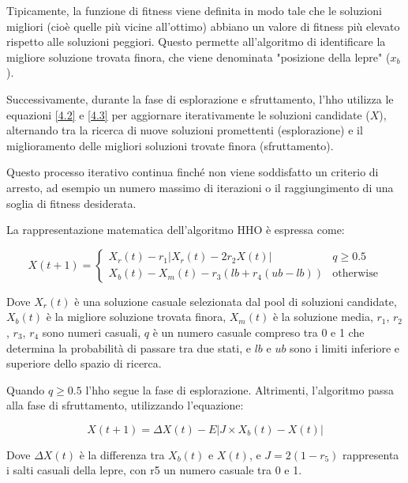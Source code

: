 Tipicamente, la funzione di fitness viene definita in modo tale che le soluzioni migliori (cioè quelle più vicine all'ottimo) abbiano un valore di fitness più elevato rispetto alle soluzioni peggiori. Questo permette all'algoritmo di identificare la migliore soluzione trovata finora, che viene denominata "posizione della lepre" ($x_b$).

Successivamente, durante la fase di esplorazione e sfruttamento, l'\gls{hho} utilizza le equazioni \eqref{4.2} e \eqref{4.3} per aggiornare iterativamente le soluzioni candidate ($X$), alternando tra la ricerca di nuove soluzioni promettenti (esplorazione) e il miglioramento delle migliori soluzioni trovate finora (sfruttamento). 

Questo processo iterativo continua finché non viene soddisfatto un criterio di arresto, ad esempio un numero massimo di iterazioni o il raggiungimento di una soglia di fitness desiderata.

La rappresentazione matematica dell'algoritmo HHO è espressa come:

\begin{equation}
      X(t+1) =
      \begin{cases}
            X_r(t) - r_1 |X_r(t) - 2r_2 X(t)| &  q \ge 0.5 \\
            X_b(t) - X_m(t) - r_3 (lb + r_4 (ub - lb)) & \text{otherwise}
      \end{cases}
      \label{4.2}
\end{equation} 

Dove $X_r(t)$  è una soluzione casuale selezionata dal pool di soluzioni candidate, $X_{b}(t)$ è la migliore soluzione trovata finora, $X_{m}(t)$ è la soluzione media, $r_1$, $r_2$, $r_3$, $r_4$ sono numeri casuali, $q$ è un numero casuale compreso tra 0 e 1 che determina la probabilità di passare tra due stati, e $lb$ e $ub$ sono i limiti inferiore e superiore dello spazio di ricerca.

Quando $q\geq0.5$ l'\gls{hho} segue la fase di esplorazione. Altrimenti, l'algoritmo passa alla fase di sfruttamento, utilizzando l'equazione:

\begin{equation}
      X(t+1) = \Delta X(t) - E|J \times X_b(t) - X(t)| 
      \label{4.3}
\end{equation}

Dove $\Delta X(t)$ è la differenza tra $X_{b}(t)$ e $X(t)$, e $J = 2(1-r_{5})$ rappresenta i salti casuali della lepre, con r5 un numero casuale tra 0 e 1.

